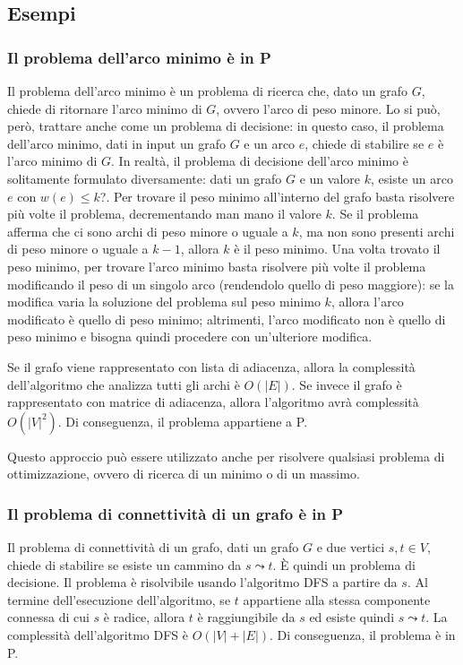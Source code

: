 \subsection{Esempi}
\subsubsection{Il problema dell'arco minimo è in P}
Il problema dell'arco minimo è un problema di ricerca che, dato un grafo $G$, chiede di ritornare l'arco minimo di $G$, ovvero l'arco di peso minore.
Lo si può, però, trattare anche come un problema di decisione: in questo caso, il problema dell'arco minimo, dati in input un grafo $G$ e un arco $e$, chiede di stabilire se $e$ è l'arco minimo di $G$. 
In realtà, il problema di decisione dell'arco minimo è solitamente formulato diversamente: dati un grafo $G$ e un valore $k$, esiste un arco $e$ con $w(e) \le k$?.
Per trovare il peso minimo all'interno del grafo basta risolvere più volte il problema, decrementando man mano il valore $k$. Se il problema afferma che ci sono archi di peso minore o uguale a $k$, ma non sono presenti archi di peso minore o uguale a $k-1$, allora $k$ è il peso minimo.
Una volta trovato il peso minimo, per trovare l'arco minimo basta risolvere più volte il problema modificando il peso di un singolo arco (rendendolo quello di peso maggiore): se la modifica varia la soluzione del problema sul peso minimo $k$, allora l'arco modificato è quello di peso minimo; altrimenti, l'arco modificato non è quello di peso minimo e bisogna quindi procedere con un'ulteriore modifica.

Se il grafo viene rappresentato con lista di adiacenza, allora la complessità dell'algoritmo che analizza tutti gli archi è $O(|E|)$. Se invece il grafo è rappresentato con matrice di adiacenza, allora l'algoritmo avrà complessità $O(|V|^2)$.
Di conseguenza, il problema appartiene a P.

Questo approccio può essere utilizzato anche per risolvere qualsiasi problema di ottimizzazione, ovvero di ricerca di un minimo o di un massimo.


\subsubsection{Il problema di connettività di un grafo è in P}
Il problema di connettività di un grafo, dati un grafo $G$ e due vertici $s, t \in V$, chiede di stabilire se esiste un cammino da $s \leadsto t$.
È quindi un problema di decisione.
Il problema è risolvibile usando l'algoritmo DFS a partire da $s$.
Al termine dell'esecuzione dell'algoritmo, se $t$ appartiene alla stessa componente connessa di cui $s$ è radice, allora 
$t$ è raggiungibile da $s$ ed esiste quindi $s \leadsto t$.
La complessità dell'algoritmo DFS è $O(|V| + |E|)$.
Di conseguenza, il problema è in P.

